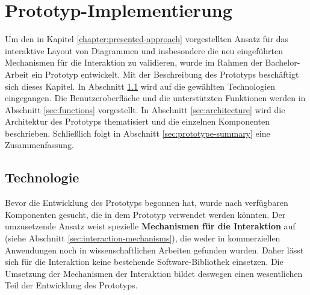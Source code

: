 
\chapter{Prototyp-Implementierung}
\label{chapter:prototype}

Um den in Kapitel \ref{chapter:presented-approach} vorgestellten Ansatz für das interaktive Layout von Diagrammen und insbesondere die neu eingeführten Mechanismen für die Interaktion zu validieren, wurde im Rahmen der Bachelor-Arbeit ein Prototyp entwickelt. Mit der Beschreibung des Prototyps beschäftigt sich dieses Kapitel. In Abschnitt \ref{sec:technologies} wird auf die gewählten Technologien eingegangen. Die Benutzeroberfläche und die unterstützten Funktionen werden in Abschnitt \ref{sec:functions} vorgestellt. In Abschnitt \ref{sec:architecture} wird die Architektur des Prototyps thematisiert und die einzelnen Komponenten beschrieben. Schließlich folgt in Abschnitt \ref{sec:prototype-summary} eine Zusammenfassung.

\section{Technologie}
\label{sec:technologies}

Bevor die Entwicklung des Prototyps begonnen hat, wurde nach verfügbaren Komponenten gesucht, die in dem Prototyp verwendet werden könnten. Der umzusetzende Ansatz weist spezielle \textbf{Mechanismen für die Interaktion} auf (siehe Abschnitt \ref{sec:interaction-mechanisms}), die weder in kommerziellen Anwendungen noch in wissenschaftlichen Arbeiten gefunden wurden. Daher lässt sich für die Interaktion keine bestehende Software-Bibliothek einsetzen. Die Umsetzung der Mechanismen der Interaktion bildet deswegen einen wesentlichen Teil der Entwicklung des Prototyps.

